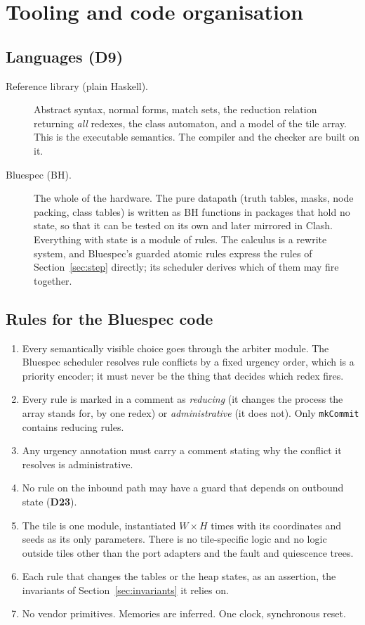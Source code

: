 \documentclass[10.5pt,a4paper]{extarticle}
\newcommand{\kw}[1]{\texttt{#1}}
\newcommand{\dec}[1]{\textbf{D#1}}
\theoremstyle{definition}
\theoremstyle{remark}
\begin{document}
\section{Tooling and code organisation}\label{sec:tooling}

\subsection{Languages (\dec{9})}

\begin{description}
\item[Reference library (plain Haskell).] Abstract syntax, normal forms,
match sets, the reduction relation returning \emph{all} redexes, the class
automaton, and a model of the tile array. This is the executable semantics.
The compiler and the checker are built on it.
\item[Bluespec (BH).] The whole of the hardware. The pure datapath (truth
tables, masks, node packing, class tables) is written as BH functions in
packages that hold no state, so that it can be tested on its own and later
mirrored in Clash. Everything with state is a module of rules. The calculus
is a rewrite system, and Bluespec's guarded atomic rules express the rules
of Section~\ref{sec:step} directly; its scheduler derives which of them may
fire together.
\end{description}

\subsection{Rules for the Bluespec code}

\begin{enumerate}
\item Every semantically visible choice goes through the arbiter module.
The Bluespec scheduler resolves rule conflicts by a fixed urgency order,
which is a priority encoder; it must never be the thing that decides which
redex fires.
\item Every rule is marked in a comment as \emph{reducing} (it changes the
process the array stands for, by one redex) or \emph{administrative} (it
does not). Only \kw{mkCommit} contains reducing rules.
\item Any urgency annotation must carry a comment stating why the conflict
it resolves is administrative.
\item No rule on the inbound path may have a guard that depends on outbound
state (\dec{23}).
\item The tile is one module, instantiated $W \times H$ times with its
coordinates and seeds as its only parameters. There is no tile-specific
logic and no logic outside tiles other than the port adapters and the fault
and quiescence trees.
\item Each rule that changes the tables or the heap states, as an assertion,
the invariants of Section~\ref{sec:invariants} it relies on.
\item No vendor primitives. Memories are inferred. One clock, synchronous
reset.
\end{enumerate}
\end{document}
